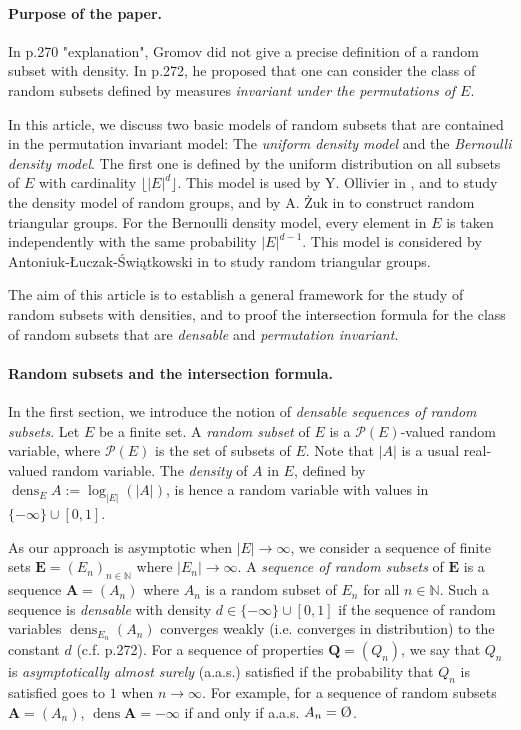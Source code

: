 \documentclass{article}
\DeclareMathOperator{\dens}{dens}
\newcommand{\vide}{\textup{\O}}
\newcommand{\bs}{\boldsymbol}
\newcommand\flr[1]{\lfloor #1 \rfloor}
\theoremstyle{remark}
\begin{document}
\paragraph{Purpose of the paper.}  In \cite{Gro93} p.270 "explanation", Gromov did not give a precise definition of a random subset with density. In \cite{Gro93} p.272, he proposed that one can consider the class of random subsets defined by measures \textit{invariant under the permutations of $E$}.

In this article, we discuss two basic models of random subsets that are contained in the permutation invariant model: The \textit{uniform density model} and the \textit{Bernoulli density model}. The first one is defined by the uniform distribution on all subsets of $E$ with cardinality $\flr{|E|^d}$. This model is used by Y. Ollivier in \cite{Oll03}, \cite{Oll04} and \cite{Oll07} to study the density model of random groups, and by A. \.Zuk in \cite{Zuk03} to construct random triangular groups. For the Bernoulli density model, every element in $E$ is taken independently with the same probability $|E|^{d-1}$. This model is considered by Antoniuk-Łuczak-\'Swi\k atkowski in \cite{ALS15} to study random triangular groups.

The aim of this article is to establish a general framework for the study of random subsets with densities, and to proof the intersection formula for the class of random subsets that are \textit{densable} and \textit{permutation invariant}.

\paragraph{Random subsets and the intersection formula.}

In the first section, we introduce the notion of \textit{densable sequences of random subsets}. Let $E$ be a finite set. A \textit{random subset} of $E$ is a $\mathcal{P}(E)$-valued random variable, where $\mathcal{P}(E)$ is the set of subsets of $E$. Note that $|A|$ is a usual real-valued random variable. The \textit{density} of $A$ in $E$, defined by $\dens_E A := \log_{|E|} (|A|)$, is hence a random variable with values in $\{-\infty\}\cup[0,1]$.

As our approach is asymptotic when $|E|\to\infty$, we consider a sequence of finite sets $\bs E = (E_n)_{n\in\mathbb{N}}$ where $|E_n|\to\infty$. A \textit{sequence of random subsets} of $\bs E$ is a sequence $\bs A = (A_n)$ where $A_n$ is a random subset of $E_n$ for all $n\in \mathbb{N}$. Such a sequence is \textit{densable} with density $d\in \{-\infty\}\cup[0,1]$ if the sequence of random variables $\dens_{E_n}(A_n)$ converges weakly (i.e. converges in distribution) to the constant $d$ (c.f. \cite{Gro93} p.272). For a sequence of properties $\bs Q = (Q_n)$, we say that $Q_n$ is \textit{asymptotically almost surely} (a.a.s.) satisfied if the probability that $Q_n$ is satisfied goes to $1$ when $n\to\infty$. For example, for a sequence of random subsets $\bs A = (A_n)$, $\dens \bs A = -\infty$ if and only if a.a.s. $A_n=\vide$.\\
\end{document}
